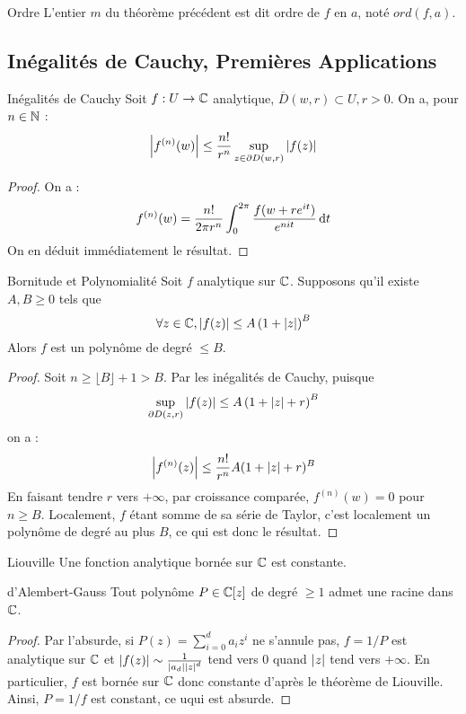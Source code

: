 \documentclass{cours}
\begin{document}
\begin{définition}{Ordre}{}
    L'entier $m$ du théorème précédent est dit ordre de $f$ en $a$, noté $ord(f, a)$.
\end{définition}

\subsection{Inégalités de Cauchy, Premières Applications}
\begin{propositionfr}{Inégalités de Cauchy}{}
    Soit $f : U \to \mathbb{C}$ analytique, $\overline{D}(w, r) \subset U, r > 0$. On a, pour $n \in \mathbb{N}$ : 
    \[
        \left|f^{(n)}(w)\right|\leq \frac{n!}{r^{n}}\sup_{z \in \partial D(w, r)}\left|f(z)\right|
    \]
\end{propositionfr}
\begin{proof}
    On a :
    \[
        f^{(n)}(w) = \frac{n!}{2\pi r^{n}}\int_{0}^{2\pi}\frac{f(w + re^{it})}{e^{nit}} {\rm \, d} t
    \]
    On en déduit immédiatement le résultat.
\end{proof}
\begin{lemme}{Bornitude et Polynomialité}{}
    Soit $f$ analytique sur $\mathbb{C}$. Supposons qu'il existe $A, B \geq 0$ tels que 
    \[
        \forall z \in \mathbb{C}, \left|f(z)\right|\leq A\left(1 + \left|z\right|\right)^{B}
    \] 
    Alors $f$ est un polynôme de degré $\leq B$. 
\end{lemme}
\begin{proof}
    Soit $n \geq \lfloor B \rfloor + 1 > B$. Par les inégalités de Cauchy, puisque 
    \[
        \sup_{\partial D(z, r)} \left|f(z)\right| \leq A\left(1 + \left|z\right| + r\right)^{B}
    \]
    on a : 
    \[
        \left|f^{(n)}(z)\right| \leq \frac{n!}{r^{n}}A(1 + \left|z\right| + r)^{B}
    \]
    En faisant tendre $r$ vers $+\infty$, par croissance comparée, $f^{(n)}(w) = 0$ pour $n \geq B$. Localement, $f$ étant somme de sa série de Taylor, c'est localement un polynôme de degré au plus $B$, ce qui est donc le résultat.
\end{proof}

\begin{théorème}{Liouville}{}
    Une fonction analytique bornée sur $\mathbb{C}$ est constante.
\end{théorème}

\begin{théorème}{d'Alembert-Gauss}{}
    Tout polynôme $P \in \mathbb{C}[z]$ de degré $\geq 1$ admet une racine dans $\mathbb{C}$.
\end{théorème}
\begin{proof}
    Par l'absurde, si $P(z) = \sum_{i = 0}^{d}a_{i}z^{i}$ ne s'annule pas, $f = 1/P$ est analytique sur $\mathbb{C}$ et $\left|f(z)\right| \sim \frac{1}{\left|a_{d}\right|\left|z\right|^{d}}$ tend vers $0$ quand $\left|z\right|$ tend vers $+\infty$. En particulier, $f$ est bornée sur $\mathbb{C}$ donc constante d'après le théorème de Liouville. Ainsi, $P = 1/f$ est constant, ce uqui est absurde.
\end{proof}
\end{document}
